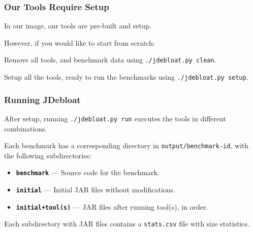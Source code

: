 \documentclass[aspectratio=169]{beamer}
\begin{document}
  \begin{frame}
    \frametitle{Our Tools Require Setup}

    In our image, our tools are pre-built and setup.

    \vspace{3em}

    However, if you would like to start from scratch:

    \vspace{1em}

    \hspace{2em} Remove all tools, and benchmark data using \texttt{./jdebloat.py clean}.

    \vspace{1em}

    \hspace{2em} Setup all the tools, ready to run the benchmarks using \texttt{./jdebloat.py setup}.
  \end{frame}

  \begin{frame}
    \frametitle{Running JDebloat}

    After setup, running \texttt{./jdebloat.py run} executes the tools in different combinations.

    \vspace{3em}

    Each benchmark has a corresponding directory in \texttt{output/benchmark-id}, with the following subdirectories:

    \vspace{1em}

    \begin{itemize}
      \item[] {\bfseries \texttt{benchmark}} --- Source code for the benchmark.
      \vspace{1em}
      \item[] {\bfseries \texttt{initial}} --- Initial JAR files without modifications.
      \vspace{1em}
      \item[] {\bfseries \texttt{initial+tool(s)}} --- JAR files after running tool(s), in order.
    \end{itemize}

    \vspace{1em}

    Each subdirectory with JAR files contains a \texttt{stats.csv} file with size statistics.
  \end{frame}
\end{document}
